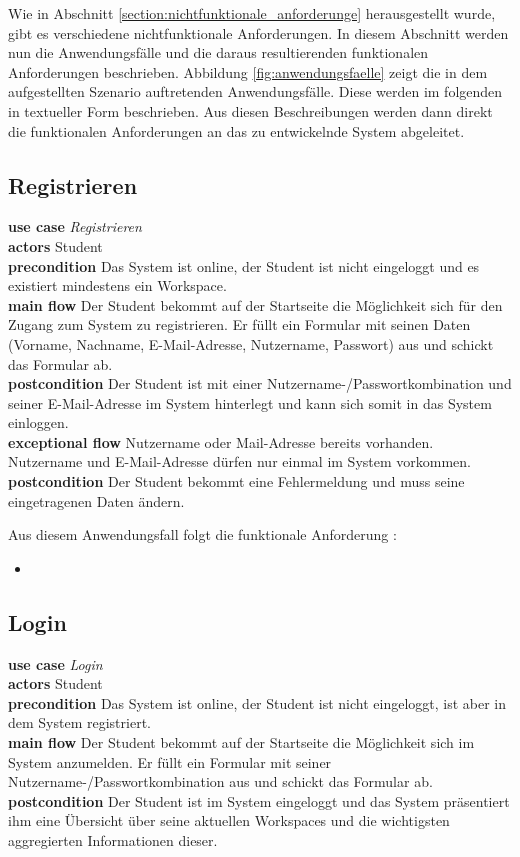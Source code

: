 Wie in Abschnitt \ref{section:nichtfunktionale_anforderunge} herausgestellt wurde, gibt es verschiedene nichtfunktionale Anforderungen. In diesem Abschnitt werden nun die Anwendungsfälle und die daraus resultierenden funktionalen Anforderungen beschrieben. Abbildung \ref{fig:anwendungsfaelle} zeigt die in dem aufgestellten Szenario auftretenden Anwendungsfälle. Diese werden im folgenden in textueller Form beschrieben. Aus diesen Beschreibungen werden dann direkt die funktionalen Anforderungen an das zu entwickelnde System abgeleitet.

\subsection{Registrieren}
\textbf{use case} \emph{Registrieren}\\
\textbf{actors} Student\\
\textbf{precondition} Das System ist online, der Student ist nicht eingeloggt und es existiert mindestens ein Workspace.\\
\textbf{main flow} Der Student bekommt auf der Startseite die Möglichkeit sich für den Zugang zum System zu registrieren. Er füllt ein Formular mit seinen Daten (Vorname, Nachname, E-Mail-Adresse, Nutzername, Passwort) aus und schickt das Formular ab.\\
\textbf{postcondition} Der Student ist mit einer Nutzername-/Passwortkombination und seiner E-Mail-Adresse im System hinterlegt und kann sich somit in das System einloggen.\\
\textbf{exceptional flow} Nutzername oder Mail-Adresse bereits vorhanden. Nutzername und E-Mail-Adresse dürfen nur einmal im System vorkommen.\\
\textbf{postcondition} Der Student bekommt eine Fehlermeldung und muss seine eingetragenen Daten ändern.
 
Aus diesem Anwendungsfall folgt die funktionale Anforderung :
\begin{itemize}
 \item \requirement{\requirementRegistrieren}\label{requirementRegistrieren}
\end{itemize}
 
\subsection{Login}
\textbf{use case} \emph{Login}\\
\textbf{actors} Student\\
\textbf{precondition} Das System ist online, der Student ist nicht eingeloggt, ist aber in dem System registriert.\\
\textbf{main flow} Der Student bekommt auf der Startseite die Möglichkeit sich im System anzumelden. Er füllt ein Formular mit seiner Nutzername-/Passwortkombination aus und schickt das Formular ab.\\
\textbf{postcondition} Der Student ist im System eingeloggt und das System präsentiert ihm eine Übersicht über seine aktuellen Workspaces und die wichtigsten aggregierten Informationen dieser.
 
